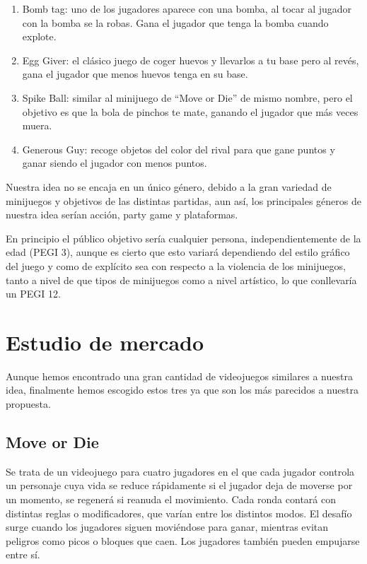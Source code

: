 \documentclass[12pt, spanish]{article}
\begin{document}
\begin{enumerate}
	\item Bomb tag: uno de los jugadores aparece con una bomba, al tocar al jugador con la bomba se la robas. Gana el jugador que tenga la bomba cuando explote.
	\item Egg Giver: el clásico juego de coger huevos y llevarlos a tu base pero al revés, gana el jugador que menos huevos tenga en su base.
	\item Spike Ball: similar al minijuego de “Move or Die” de mismo nombre, pero el objetivo es que la bola de pinchos te mate, ganando el jugador que más veces muera.
	\item Generous Guy: recoge objetos del color del rival para que gane puntos y ganar siendo el jugador con menos puntos.
\end{enumerate}


Nuestra idea no se encaja en un único género, debido a la gran variedad de minijuegos y objetivos de las distintas partidas, aun así, los principales géneros de nuestra idea serían acción, party game y plataformas.

En principio el público objetivo sería cualquier persona, independientemente de la edad (PEGI 3), aunque es cierto que esto variará dependiendo del estilo gráfico del juego y como de explícito sea con respecto a la violencia de los minijuegos, tanto a nivel de que tipos de minijuegos como a nivel artístico, lo que conllevaría un PEGI 12.

\section{Estudio de mercado}

Aunque hemos encontrado una gran cantidad de videojuegos similares a nuestra idea, finalmente hemos escogido estos tres ya que son los más parecidos a nuestra propuesta.

\subsection{Move or Die}

Se trata de un videojuego para cuatro jugadores en el que cada jugador controla un personaje cuya vida se reduce rápidamente si el jugador deja de moverse por un momento, se regenerá si reanuda el movimiento. Cada ronda contará con distintas reglas o modificadores, que varían entre los distintos modos. El desafío surge cuando los jugadores siguen moviéndose para ganar, mientras evitan peligros como picos o bloques que caen. Los jugadores también pueden empujarse entre sí.
\end{document}
